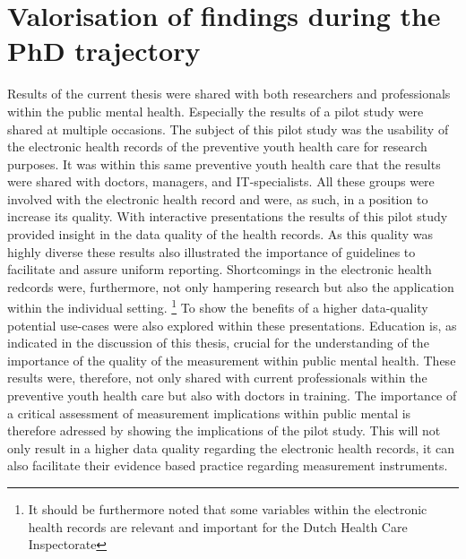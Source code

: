 \section*{Valorisation of findings during the PhD trajectory}
Results of the current thesis were shared with both researchers and professionals within the public mental health. 
Especially the results of a pilot study \parencite{Hoofs_DDJGZ} were shared at multiple occasions.
The subject of this pilot study was the usability of the electronic health records of the preventive youth health care for research purposes. 
It was within this same preventive youth health care that the results were shared with doctors, managers, and IT-specialists.
All these groups were involved with the electronic health record and were, as such, in a position to increase its quality. 
With interactive presentations the results of this pilot study provided insight in the data quality of the health records. 
As this quality was highly diverse these results also illustrated the importance of guidelines to facilitate and assure uniform reporting. 
Shortcomings in the electronic health redcords were, furthermore, not only hampering research but also the application within the individual setting.
\footnote{It should be furthermore noted that some variables within the electronic health records are relevant and important for the Dutch Health Care Inspectorate} 
To show the benefits of a higher data-quality potential use-cases were also explored within these presentations.
Education is, as indicated in the discussion of this thesis, crucial for the understanding of the importance of the quality of the measurement within public mental health.
These results were, therefore, not only shared with current professionals within the preventive youth health care but also with doctors in training. 
The importance of a critical assessment of measurement implications within public mental is therefore adressed by showing the implications of the pilot study.
This will not only result in a higher data quality regarding the electronic health records, it can also facilitate their evidence based practice regarding measurement instruments.

